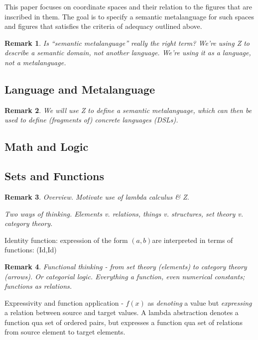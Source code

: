 \documentclass[reqno,12pt]{tufte-handout}
\numberwithin{equation}{subsection}
\numberwithin{equation}{subsection}
\newtheorem{remark}{Remark}
\newcommand\ab{\((a,b)\)}
\begin{document}
This paper focuses on coordinate spaces and their relation to the
figures that are inscribed in them.  The goal is to specify a semantic
metalanguage for such spaces and figures that satisfies the criteria
of adequacy outlined above.

\begin{remark}
  Is ``semantic metalanguage'' really the right term?  We're using Z
  to describe a semantic domain, not another language.  We're using it
  as a language, not a metalanguage.
\end{remark}

\subsection{Language and Metalanguage}
\label{subs:langmetalang}

\begin{remark}
  We will use Z to define a semantic metalanguage, which can then be
  used to define (fragments of) concrete languages (DSLs).
\end{remark}

\subsection{Math and Logic}
\label{subs:mathlogic}

\subsection{Sets and Functions}
\label{subs:functions}

\begin{remark}
  Overview.  Motivate use of lambda calculus \& Z.

  Two ways of thinking.  Elements v. relations, things v. structures,
  set theory v. category theory.
\end{remark}

Identity function: expression of the form \ab are interpreted in terms
of functions: (Id,Id)

\begin{remark}
  Functional thinking - from set theory (elements) to category theory
  (arrows).  Or categorial logic.  Everything a function, even
  numerical constants; functions as relations.
\end{remark}

Expressivity and function application - \(f(x)\) as \textit{denoting}
a value but \textit{expressing} a relation between source and target
values.  A lambda abstraction denotes a function qua set of ordered
pairs, but expresses a function qua set of relations from source
element to target elements.
\end{document}
